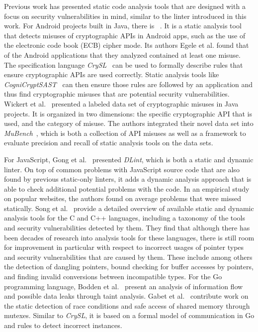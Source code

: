Previous work has presented static code analysis tools that are designed with a focus on security vulnerabilities in
mind, similar to the \toolSafer{} linter introduced in this work.
For Android projects built in Java, there is \toolCryptolint{}~\cite{egele2013}.
It is a static analysis tool that detects misuses of cryptographic \acrshort{API}s in Android apps, such as the use of
the electronic code book (\acrshort{ECB}) cipher mode.
Its authors Egele et al. found that  of the  Android applications that they analyzed
contained at least one misuse.
The specification language \textit{CrySL}~\cite{kruger2018} can be used to formally describe rules that ensure
cryptographic \acrshort{API}s are used correctly.
Static analysis tools like \textit{CogniCryptSAST}~\cite{kruger2017} can then ensure those rules are followed by an
application and thus find cryptographic misuses that are potential security vulnerabilities.
Wickert et al.~\cite{wickert2019} presented a labeled data set of  cryptographic misuses in Java projects.
It is organized in two dimensions: the specific cryptographic \acrshort{API} that is used, and the category of misuse.
The authors integrated their novel data set into \textit{MuBench}~\cite{amann2016}, which is both a collection of
\acrshort{API} misuses as well as a framework to evaluate precision and recall of static analysis tools on the data
sets.

For JavaScript, Gong et al.~\cite{gong2015} presented \textit{DLint}, which is both a static and dynamic linter.
On top of common problems with JavaScript source code that are also found by previous static-only linters, it adds a
dynamic analysis approach that is able to check  additional potential problems with the code.
In an empirical study on  popular websites, the authors found on average  problems
that were missed statically.
Song et al.~\cite{song2019} provide a detailed overview of available static and dynamic analysis tools for the C and C++
languages, including a taxonomy of the tools and security vulnerabilities detected by them.
They find that although there has been decades of research into analysis tools for these languages, there is still room
for improvement in particular with respect to incorrect usages of pointer types and security vulnerabilities that are
caused by them.
These include among others the detection of dangling pointers, bound checking for buffer accesses by pointers, and
finding invalid conversions between incompatible types.
For the Go programming language, Bodden et al.~\cite{bodden2016} present an analysis of information flow and possible
data leaks through taint analysis.
Gabet et al.~\cite{gabet2020} contribute work on the static detection of race conditions and safe access of shared
memory through mutexes.
Similar to \textit{CrySL}, it is based on a formal model of communication in Go and rules to detect incorrect instances.

